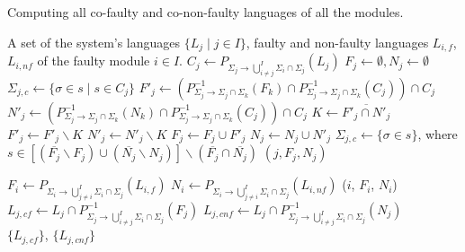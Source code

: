 \documentclass[a4paper, 10pt, conference]{ieeeconf}
\begin{document}
\begin{algorithm} Computing all co-faulty and co-non-faulty languages of
all the modules.
\label{alg:full_co_faulty}
\begin{algorithmic}[1]
	\Require A set of the system's languages $\{L_j\mid j \in I\}$, faulty and
	non-faulty languages $L_{i,f}$, $L_{i,nf}$ of the faulty module $i\in I$.
	\label{alg:fcf_init}
		\State $C_j \leftarrow 
			P_{\Sigma_j \rightarrow \bigcup_{i\neq j}^I \Sigma_i\cap \Sigma_j}(L_j)$
		\State $F_j \leftarrow \emptyset, N_j \leftarrow \emptyset$
		\State $\Sigma_{j,c} \leftarrow \{\sigma \in s \mid s \in C_j\}$
	\EndFor
			\State $F'_j \leftarrow (
			P_{\Sigma_j \rightarrow \Sigma_j \cap \Sigma_k}^{-1}(F_k)
			\cap 
			P_{\Sigma_j \rightarrow \Sigma_j \cap \Sigma_k}^{-1}(C_j) 
			)\cap C_j$
			\label{alg:fcf_partial_begin}
			\State $N'_j \leftarrow (
			P_{\Sigma_j \rightarrow \Sigma_j \cap \Sigma_k}^{-1}(N_k)
			\cap 
			P_{\Sigma_j \rightarrow \Sigma_j \cap \Sigma_k}^{-1}(C_j) 
			)\cap C_j$ 
			\State $K \leftarrow \overline{F'_j \cap N'_j}$
			\State $F'_j \leftarrow F'_j \backslash K$
			\State $N'_j \leftarrow N'_j \backslash K$
			\label{alg:fcf_partial_end}
				\label{alg:fcf_update}
				\State $F_j \leftarrow F_j \cup F'_j$
				\State $N_j \leftarrow N_j \cup N'_j$
				\State $\Sigma_{j,c} \leftarrow
					\{\sigma \in s \}$, where
				\State $s \in
						\left[(\overline{F_j} \backslash F_j) \cup
						(\overline{N_j} \backslash N_j)\right] \backslash	
						(\overline{F_j} \cap \overline{N_j})
						$
				\State {}$(j, F_j, N_j)$
			\EndIf
		\EndFor
	\EndProcedure
	
	\State $F_i \leftarrow 
		\label{alg:fcf_Fi}
		P_{\Sigma_i \rightarrow \bigcup_{j\neq i}^I \Sigma_i\cap \Sigma_j}(L_{i,f})$
	\State $N_i \leftarrow 
		P_{\Sigma_i \rightarrow \bigcup_{j\neq i}^I \Sigma_i\cap \Sigma_j}(L_{i,nf})$
	\State {}($i$, $F_i$, $N_i$)
		\label{alg:fcf_final}
		\State $L_{j,cf} \leftarrow L_j \cap 
		P_{\Sigma_j \rightarrow \bigcup_{i\neq j}^I \Sigma_i\cap \Sigma_j}^{-1}(F_j)$
		\State $L_{j,cnf} \leftarrow L_j \cap 
		P_{\Sigma_j \rightarrow \bigcup_{i\neq j}^I \Sigma_i\cap \Sigma_j}^{-1}(N_j)$
	\EndFor
	\\
	\Return $\{L_{j,cf}\}$, $\{L_{j,cnf}\}$
\end{algorithmic}
\end{algorithm}
\end{document}
